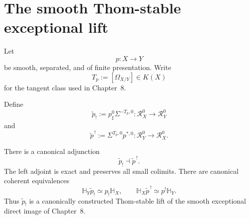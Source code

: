 \section{The smooth Thom-stable exceptional lift}
\label{sec:bn-diff-smooth-thom-stable-umkehr}

Let
\[
  p:X\longrightarrow Y
\]
be smooth, separated, and of finite presentation.  Write
\[
  T_p:=[\Omega_{X/Y}]\in K(X)
\]
for the tangent class used in Chapter~8.

\begin{definition}
\label{def:bn-diff-smooth-thom-stable-umkehr}
Define
\[
  \boxed{
  \widetilde p_!
  :=
  p_\sharp^0\Sigma^{-T_p,0}:
  \mathcal R_X^0\longrightarrow\mathcal R_Y^0
  }
\]
and
\[
  \boxed{
  \widetilde p^{\,!}
  :=
  \Sigma^{T_p,0}p^{*,0}:
  \mathcal R_Y^0\longrightarrow\mathcal R_X^0.
  }
\]
\end{definition}

\begin{theorem}
\label{thm:bn-diff-smooth-thom-stable-umkehr}
There is a canonical adjunction
\[
  \boxed{
  \widetilde p_!
  \dashv
  \widetilde p^{\,!}.
  }
\]
The left adjoint is exact and preserves all small colimits.  There are canonical
coherent equivalences
\[
  \boxed{
  \mathbb H_Y\widetilde p_!
  \simeq
  p_!\mathbb H_X,
  \qquad
  \mathbb H_X\widetilde p^{\,!}
  \simeq
  p^!\mathbb H_Y.
  }
\]
Thus \(\widetilde p_!\) is a canonically constructed Thom-stable lift of the
smooth exceptional direct image of Chapter~8.
\end{theorem}

